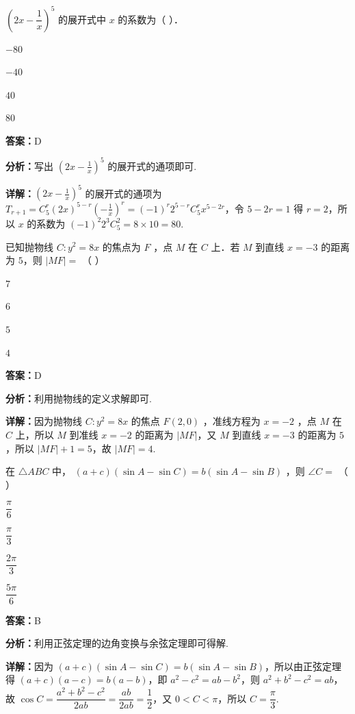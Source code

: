 \begin{question}[points=4]
$\left(2x - \dfrac{1}{x}\right)^5$ 的展开式中 $x$ 的系数为（ ）．
\begin{choices}
  \item $-80$
  \item $-40$
  \item $40$
  \item $80$
\end{choices}
\begin{solution}
\textbf{答案：}D

\textbf{分析：}写出 $\left(2x - \frac{1}{x}\right)^5$ 的展开式的通项即可.

\textbf{详解：}$\left(2x - \frac{1}{x}\right)^5$ 的展开式的通项为 $T_{r+1} = C_5^r (2x)^{5-r} \left(-\frac{1}{x}\right)^r = (-1)^r 2^{5-r} C_5^r x^{5-2r}$，令 $5-2r=1$ 得 $r=2$，所以 $x$ 的系数为 $(-1)^2 2^{3} C_5^2 = 8 \times 10 = 80$.
\end{solution}
\end{question}

\begin{question}[points=4]
已知抛物线 $C: y^2 = 8x$ 的焦点为 $F$ ，点 $M$ 在 $C$ 上．若 $M$ 到直线 $x = -3$ 的距离为 $5$，则 $|MF| =$ （ ）
\begin{choices}
  \item $7$
  \item $6$
  \item $5$
  \item $4$
\end{choices}
\begin{solution}
\textbf{答案：}D

\textbf{分析：}利用抛物线的定义求解即可.

\textbf{详解：}因为抛物线 $C: y^2 = 8x$ 的焦点 $F(2,0)$ ，准线方程为 $x = -2$ ，点 $M$ 在 $C$ 上，所以 $M$ 到准线 $x = -2$ 的距离为 $|MF|$，又 $M$ 到直线 $x = -3$ 的距离为 $5$，所以 $|MF| + 1 = 5$，故 $|MF| = 4$.
\end{solution}
\end{question}

\begin{question}[points=4]
在 $\triangle ABC$ 中， $(a+c)(\sin A - \sin C) = b(\sin A - \sin B)$ ，则 $\angle C =$ （ ）
\begin{choices}
  \item $\dfrac{\pi}{6}$
  \item $\dfrac{\pi}{3}$
  \item $\dfrac{2\pi}{3}$
  \item $\dfrac{5\pi}{6}$
\end{choices}
\begin{solution}
\textbf{答案：}B

\textbf{分析：}利用正弦定理的边角变换与余弦定理即可得解.

\textbf{详解：}因为 $(a+c)(\sin A - \sin C) = b(\sin A - \sin B)$，所以由正弦定理得 $(a+c)(a-c) = b(a-b)$，即 $a^2 - c^2 = ab - b^2$，则 $a^2 + b^2 - c^2 = ab$，故 $\cos C = \dfrac{a^2+b^2-c^2}{2ab} = \dfrac{ab}{2ab} = \dfrac{1}{2}$，又 $0 < C < \pi$，所以 $C = \dfrac{\pi}{3}$.
\end{solution}
\end{question}

